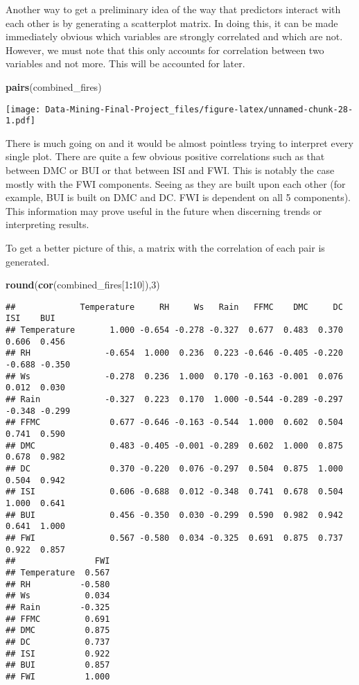 \documentclass[
]{article}
\newenvironment{Shaded}{\begin{snugshade}}{\end{snugshade}}
\newcommand{\DecValTok}[1]{\textcolor[rgb]{0.00,0.00,0.81}{#1}}
\newcommand{\FunctionTok}[1]{\textcolor[rgb]{0.13,0.29,0.53}{\textbf{#1}}}
\newcommand{\NormalTok}[1]{#1}
\newcommand{\SpecialCharTok}[1]{\textcolor[rgb]{0.81,0.36,0.00}{\textbf{#1}}}
\begin{document}
Another way to get a preliminary idea of the way that predictors
interact with each other is by generating a scatterplot matrix. In doing
this, it can be made immediately obvious which variables are strongly
correlated and which are not. However, we must note that this only
accounts for correlation between two variables and not more. This will
be accounted for later.

\begin{Shaded}
\begin{Highlighting}[]
\FunctionTok{pairs}\NormalTok{(combined\_fires)}
\end{Highlighting}
\end{Shaded}

\texttt{[image: Data-Mining-Final-Project\_files/figure-latex/unnamed-chunk-28-1.pdf]}

There is much going on and it would be almost pointless trying to
interpret every single plot. There are quite a few obvious positive
correlations such as that between DMC or BUI or that between ISI and
FWI. This is notably the case mostly with the FWI components. Seeing as
they are built upon each other (for example, BUI is built on DMC and DC.
FWI is dependent on all 5 components). This information may prove useful
in the future when discerning trends or interpreting results.

To get a better picture of this, a matrix with the correlation of each
pair is generated.

\begin{Shaded}
\begin{Highlighting}[]
\FunctionTok{round}\NormalTok{(}\FunctionTok{cor}\NormalTok{(combined\_fires[}\DecValTok{1}\SpecialCharTok{:}\DecValTok{10}\NormalTok{]),}\DecValTok{3}\NormalTok{)}
\end{Highlighting}
\end{Shaded}

\begin{verbatim}
##             Temperature     RH     Ws   Rain   FFMC    DMC     DC    ISI    BUI
## Temperature       1.000 -0.654 -0.278 -0.327  0.677  0.483  0.370  0.606  0.456
## RH               -0.654  1.000  0.236  0.223 -0.646 -0.405 -0.220 -0.688 -0.350
## Ws               -0.278  0.236  1.000  0.170 -0.163 -0.001  0.076  0.012  0.030
## Rain             -0.327  0.223  0.170  1.000 -0.544 -0.289 -0.297 -0.348 -0.299
## FFMC              0.677 -0.646 -0.163 -0.544  1.000  0.602  0.504  0.741  0.590
## DMC               0.483 -0.405 -0.001 -0.289  0.602  1.000  0.875  0.678  0.982
## DC                0.370 -0.220  0.076 -0.297  0.504  0.875  1.000  0.504  0.942
## ISI               0.606 -0.688  0.012 -0.348  0.741  0.678  0.504  1.000  0.641
## BUI               0.456 -0.350  0.030 -0.299  0.590  0.982  0.942  0.641  1.000
## FWI               0.567 -0.580  0.034 -0.325  0.691  0.875  0.737  0.922  0.857
##                FWI
## Temperature  0.567
## RH          -0.580
## Ws           0.034
## Rain        -0.325
## FFMC         0.691
## DMC          0.875
## DC           0.737
## ISI          0.922
## BUI          0.857
## FWI          1.000
\end{verbatim}
\end{document}
